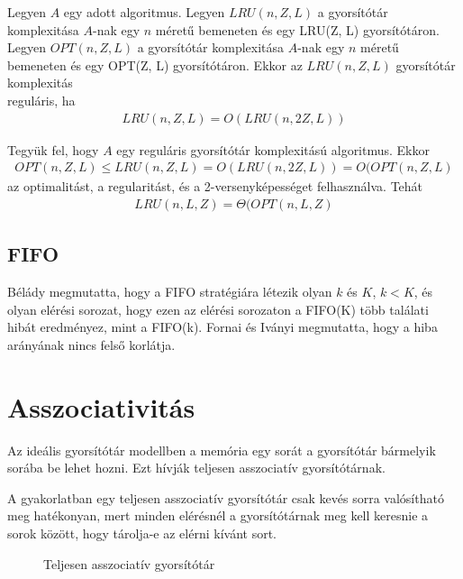 \documentclass[12pt]{report}
\begin{document}
Legyen $A$ egy adott algoritmus.
Legyen $LRU(n, Z, L)$ a gyorsítótár komplexitása $A$-nak egy $n$ méretű bemeneten
és egy LRU(Z, L) gyorsítótáron.
Legyen $OPT(n, Z, L)$ a gyorsítótár komplexitása $A$-nak egy $n$ méretű bemeneten
és egy OPT(Z, L) gyorsítótáron.
Ekkor az $LRU(n, Z, L)$ gyorsítótár komplexitás \\
reguláris\cite{prokop}, ha
\begin{align*}
LRU(n, Z, L) = O(LRU(n, 2Z, L))
\end{align*}

Tegyük fel, hogy $A$ egy reguláris gyorsítótár komplexitású algoritmus.
Ekkor
\begin{align*}
OPT(n, Z, L) \le LRU(n, Z, L) = O(LRU(n, 2Z, L)) = O(OPT(n, Z, L)
\end{align*}
az optimalitást, a regularitást, és a 2-versenyképességet felhasználva.
Tehát
\begin{align*}
LRU(n, L, Z) = \Theta(OPT(n, L, Z)
\end{align*}

\subsection{FIFO}

Bélády\cite{belady-anomaly} megmutatta,
hogy a FIFO stratégiára létezik olyan $k$ és $K$, $k < K$,
és olyan elérési sorozat, hogy ezen az elérési sorozaton a FIFO(K) több
találati hibát eredményez, mint a FIFO(k).
Fornai és Iványi megmutatta\cite{fifo-anomaly-unbounded},
hogy a hiba arányának nincs felső korlátja.

\section{Asszociativitás}

Az ideális gyorsítótár modellben a memória egy sorát a gyorsítótár
bármelyik sorába be lehet hozni.
Ezt hívják teljesen asszociatív gyorsítótárnak\cite{computer-architecture}.

A gyakorlatban egy teljesen asszociatív gyorsítótár csak kevés sorra
valósítható meg hatékonyan,
mert minden elérésnél a gyorsítótárnak meg kell keresnie a sorok között,
hogy tárolja-e az elérni kívánt sort.

\begin{figure}[ht]
\centering
{}
\caption{Teljesen asszociatív gyorsítótár}
\label{fig:fully-associative-cache}
\end{figure}
\end{document}
